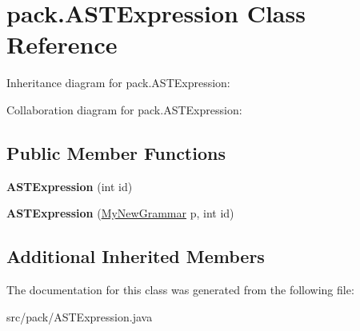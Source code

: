 \hypertarget{classpack_1_1_a_s_t_expression}{}\section{pack.\+A\+S\+T\+Expression Class Reference}
\label{classpack_1_1_a_s_t_expression}


Inheritance diagram for pack.\+A\+S\+T\+Expression\+:


Collaboration diagram for pack.\+A\+S\+T\+Expression\+:
\subsection*{Public Member Functions}
\begin{DoxyCompactItemize}
\item 
{\bfseries A\+S\+T\+Expression} (int id)\hypertarget{classpack_1_1_a_s_t_expression_aa607148bce8bc9b60e4ffc5d643582a5}{}\label{classpack_1_1_a_s_t_expression_aa607148bce8bc9b60e4ffc5d643582a5}

\item 
{\bfseries A\+S\+T\+Expression} (\hyperlink{classpack_1_1_my_new_grammar}{My\+New\+Grammar} p, int id)\hypertarget{classpack_1_1_a_s_t_expression_a2a76442e1058e16e808fbc78fad84ffa}{}\label{classpack_1_1_a_s_t_expression_a2a76442e1058e16e808fbc78fad84ffa}

\end{DoxyCompactItemize}
\subsection*{Additional Inherited Members}


The documentation for this class was generated from the following file\+:\begin{DoxyCompactItemize}
\item 
src/pack/A\+S\+T\+Expression.\+java\end{DoxyCompactItemize}
